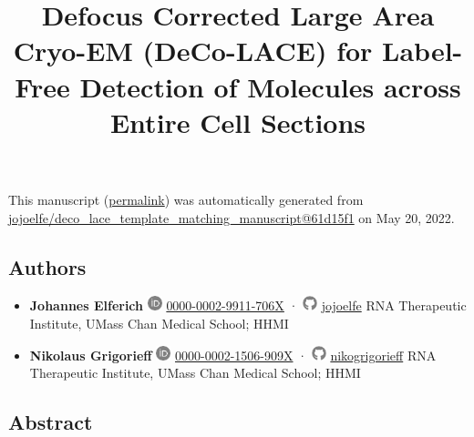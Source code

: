 \documentclass[
]{article}
\title{Defocus Corrected Large Area Cryo-EM (DeCo-LACE) for Label-Free Detection of Molecules across Entire Cell Sections}
\author{}
\date{}
\begin{document}
\maketitle

This manuscript
(\href{https://jojoelfe.github.io/deco_lace_template_matching_manuscript/v/61d15f13d08e1198660b00662e93261a41553a44/}{permalink})
was automatically generated
from \href{https://github.com/jojoelfe/deco_lace_template_matching_manuscript/tree/61d15f13d08e1198660b00662e93261a41553a44}{jojoelfe/deco\_lace\_template\_matching\_manuscript@61d15f1}
on May 20, 2022.

\hypertarget{authors}{%
\subsection{Authors}\label{authors}}

\begin{itemize}
\item
  \textbf{Johannes Elferich}
  \includegraphics[width=0.16667in,height=0.16667in]{images/orcid.pdf}
  \href{https://orcid.org/0000-0002-9911-706X}{0000-0002-9911-706X}
  · \includegraphics[width=0.16667in,height=0.16667in]{images/github.pdf}
  \href{https://github.com/jojoelfe}{jojoelfe}
  RNA Therapeutic Institute, UMass Chan Medical School; HHMI
\item
  \textbf{Nikolaus Grigorieff}
  \includegraphics[width=0.16667in,height=0.16667in]{images/orcid.pdf}
  \href{https://orcid.org/0000-0002-1506-909X}{0000-0002-1506-909X}
  · \includegraphics[width=0.16667in,height=0.16667in]{images/github.pdf}
  \href{https://github.com/nikogrigorieff}{nikogrigorieff}
  RNA Therapeutic Institute, UMass Chan Medical School; HHMI
\end{itemize}

\hypertarget{abstract}{%
\subsection{Abstract}\label{abstract}}
\end{document}
